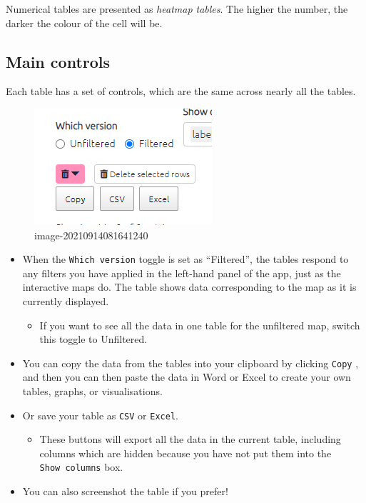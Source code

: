 \documentclass[
]{book}
\providecommand{\tightlist}{%
  \setlength{\itemsep}{0pt}\setlength{\parskip}{0pt}}
\begin{document}
Numerical tables are presented as \emph{heatmap tables}. The higher the number, the darker the colour of the cell will be.

\hypertarget{main-controls}{%
\subsection{Main controls}\label{main-controls}}

Each table has a set of controls, which are the same across nearly all the tables.

\begin{figure}
\centering
\includegraphics{_assets/image-20210914081641240.png}
\caption{image-20210914081641240}
\end{figure}

\begin{itemize}
\tightlist
\item
  When the \texttt{Which\ version} toggle is set as ``Filtered'', the tables respond to any filters you have applied in the left-hand panel of the app, just as the interactive maps do. The table shows data corresponding to the map as it is currently displayed.

  \begin{itemize}
  \tightlist
  \item
    If you want to see all the data in one table for the unfiltered map, switch this toggle to Unfiltered.
  \end{itemize}
\item
  You can copy the data from the tables into your clipboard by clicking \texttt{Copy} , and then you can then paste the data in Word or Excel to create your own tables, graphs, or visualisations.
\item
  Or save your table as \texttt{CSV} or \texttt{Excel}.

  \begin{itemize}
  \tightlist
  \item
    These buttons will export all the data in the current table, including columns which are hidden because you have not put them into the \texttt{Show\ columns} box.
  \end{itemize}
\item
  You can also screenshot the table if you prefer!
\end{itemize}
\end{document}
